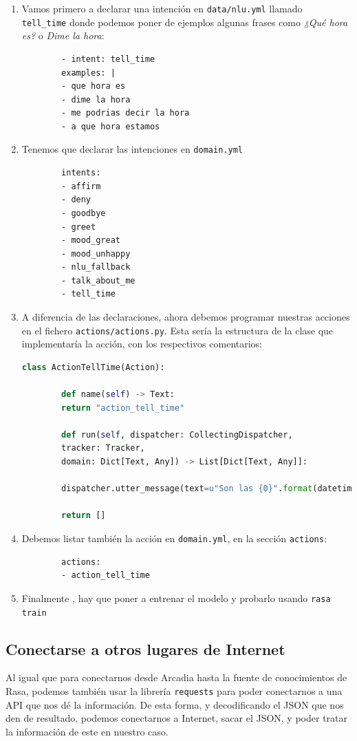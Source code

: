 \begin{enumerate}
	\item Vamos primero a declarar una intención en \texttt{data/nlu.yml} llamado \\ \texttt{tell\_time} donde podemos poner de ejemplos algunas frases como \textit{¿Qué hora es?} o \textit{Dime la hora}:
	\begin{lstlisting}
		- intent: tell_time
		examples: |
		- que hora es
		- dime la hora
		- me podrias decir la hora
		- a que hora estamos
	\end{lstlisting}
	
	\item Tenemos que declarar las intenciones en \texttt{domain.yml}
	\begin{lstlisting}
		intents:
		- affirm
		- deny
		- goodbye
		- greet
		- mood_great
		- mood_unhappy
		- nlu_fallback
		- talk_about_me
		- tell_time
	\end{lstlisting}

	\item A diferencia de las declaraciones, ahora debemos programar nuestras acciones en el fichero \texttt{actions/actions.py}. Esta sería la estructura de la clase que implementaría la acción, con los respectivos comentarios:

	\begin{lstlisting}[language=Python]
		class ActionTellTime(Action):
		
		def name(self) -> Text:
		return "action_tell_time"
		
		def run(self, dispatcher: CollectingDispatcher,
		tracker: Tracker,
		domain: Dict[Text, Any]) -> List[Dict[Text, Any]]:
		
		dispatcher.utter_message(text=u"Son las {0}".format(datetime.datetime.now().strftime('%H horas y %M minutos')))
		
		return []
	\end{lstlisting}

	\item Debemos listar también la acción en \texttt{domain.yml}, en la sección \texttt{actions}:
	\begin{lstlisting}
		actions:
		- action_tell_time
	\end{lstlisting}
	
	\item Finalmente , hay que poner a entrenar el modelo y probarlo usando \texttt{rasa train}
\end{enumerate}

\subsection{Conectarse a otros lugares de Internet}
\label{subsection:7-3-4}
Al igual que para conectarnos desde Arcadia hasta la fuente de conocimientos de Rasa, podemos también usar la librería \texttt{requests} para poder conectarnos a una API que nos dé la información. De esta forma, y decodificando el JSON que nos den de resultado, podemos conectarnos a Internet, sacar el JSON, y poder tratar la información de este en nuestro caso.

